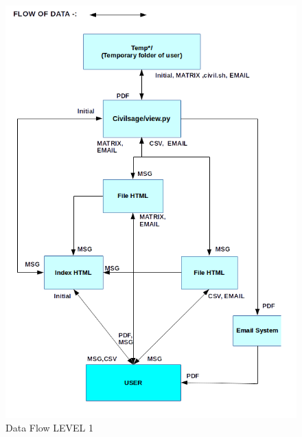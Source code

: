 \begin{figure}[H]
\centering \includegraphics[scale=0.55]{images/DFDS1.png}
\caption{Data Flow LEVEL 1}
\label{fig:DFDs1}
\end{figure}
